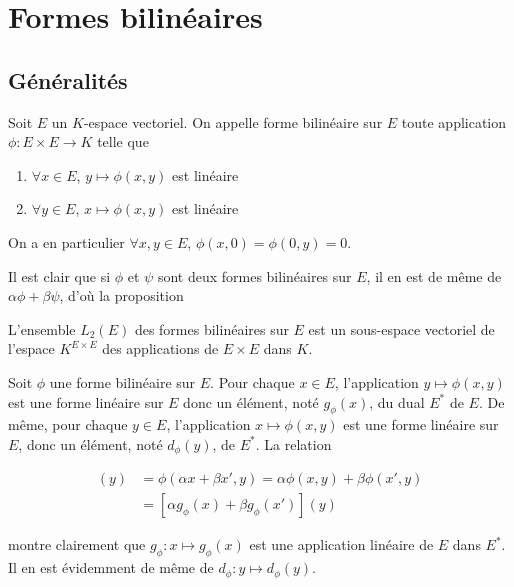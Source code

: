 \section{Formes bilinéaires}

\subsection{Généralités}

\begin{de}
Soit $E$ un $K$-espace vectoriel. On appelle forme bilinéaire sur $E$ toute application $\phi : E \times E \rightarrow K$ telle que
\begin{enumerate}
\item $\forall x \in E$, $y \mapsto \phi(x,y)$ est linéaire
\item $\forall y \in E$, $x \mapsto \phi(x,y)$ est linéaire
\end{enumerate}
\end{de}

\begin{rem}
On a en particulier $\forall x,y \in E$, $\phi(x,0) = \phi(0,y) = 0$.
\end{rem}

\begin{rem}
Il est clair que si $\phi$ et $\psi$ sont deux formes bilinéaires sur $E$, il en est de même de $\alpha \phi + \beta \psi$, d'où la proposition
\end{rem}

\begin{prop}
L'ensemble $L_2(E)$ des formes bilinéaires sur $E$ est un sous-espace vectoriel de l'espace $K^{E \times E}$ des applications de $E \times E$ dans $K$.
\end{prop}

\begin{rem}
Soit $\phi$ une forme bilinéaire sur $E$. Pour chaque $x \in E$, l'application $y \mapsto \phi(x,y)$ est une forme linéaire sur $E$ donc un élément, noté $g_\phi(x)$, du dual $E^*$ de $E$. De même, pour chaque $y \in E$, l'application $x \mapsto \phi(x,y)$ est une forme linéaire sur $E$, donc un élément, noté $d_\phi(y)$, de $E^*$. La relation

\begin{align*}
[g_\phi(\alpha x + \beta x')](y) &= \phi(\alpha x + \beta x',y) = \alpha \phi(x,y) + \beta \phi(x',y) \\
&= [\alpha g_\phi(x) + \beta g_\phi(x')](y)
\end{align*}

montre clairement que $g_\phi : x \mapsto g_\phi(x)$ est une application linéaire de $E$ dans $E^*$. Il en est évidemment de même de $d_\phi : y \mapsto d_\phi(y)$.
\end{rem}

